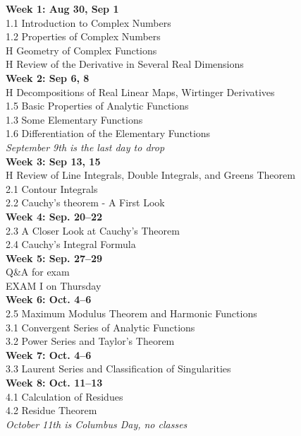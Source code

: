 \documentclass[11pt]{article}
\begin{document}
{\bf Week 1: Aug 30, Sep 1}\\
1.1 Introduction to Complex Numbers\\
1.2 Properties of Complex Numbers\\
H Geometry of Complex Functions\\
H Review of the Derivative in Several Real Dimensions\\

{\bf Week 2: Sep 6, 8}\\ 
H Decompositions of Real Linear Maps, Wirtinger Derivatives\\
1.5 Basic Properties of Analytic Functions\\
1.3 Some Elementary Functions\\
1.6 Differentiation of the Elementary Functions\\
\textit{September 9th is the last day to drop}\\

{\bf Week 3: Sep 13, 15}\\ 
H Review of Line Integrals, Double Integrals, and Greens Theorem\\
2.1 Contour Integrals\\
2.2 Cauchy's theorem - A First Look\\

{\bf Week 4: Sep. 20--22}\\ 
2.3 A Closer Look at Cauchy's Theorem\\
2.4 Cauchy's Integral Formula\\

{\bf Week 5: Sep. 27--29}\\
Q\&A for exam\\
EXAM I on Thursday\\ 

{\bf Week 6: Oct. 4--6}\\
2.5 Maximum Modulus Theorem and Harmonic Functions\\
3.1 Convergent Series of Analytic Functions\\
3.2 Power Series and Taylor's Theorem\\

{\bf Week 7: Oct. 4--6}\\ 
3.3 Laurent Series and Classification of Singularities  \\

{\bf Week 8: Oct. 11--13}\\
4.1 Calculation of Residues\\
4.2 Residue Theorem\\
\textit{October 11th is  Columbus Day, no classes }\\
\end{document}
